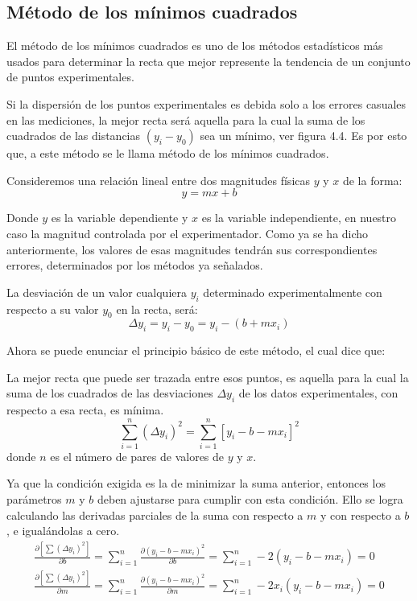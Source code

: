 \subsection{M\'etodo de los m\'inimos cuadrados}

El m\'etodo de los m\'inimos cuadrados es uno de los m\'etodos estad\'isticos m\'as usados para determinar la recta que mejor represente la tendencia de un conjunto de puntos experimentales.

Si la dispersi\'on de los puntos experimentales es debida solo a los errores casuales en las mediciones, la mejor recta ser\'a aquella para la cual la suma de los cuadrados de las distancias $\left(y_i-y_0 \right)$ sea un m\'inimo, ver figura 4.4. Es por esto que, a este m\'etodo se le llama m\'etodo de los m\'inimos cuadrados.

Consideremos una relaci\'on lineal entre dos magnitudes f\'isicas $y$ y $x$ de la forma:
$$
y=m x+b
$$

Donde $y$ es la variable dependiente y $x$ es la variable independiente, en nuestro caso la magnitud controlada por el experimentador. Como ya se ha dicho anteriormente, los valores de esas magnitudes tendr\'an sus correspondientes errores, determinados por los m\'etodos ya se\~nalados. 

La desviaci\'on de un valor cualquiera $y_i$ determinado experimentalmente con respecto a su valor $y_0$ en la recta, ser\'a:
\begin{equation}
\Delta y_i=y_i-y_0=y_i-\left(b+m x_i\right)
\label{deltay}
\end{equation}

Ahora se puede enunciar el principio b\'asico de este m\'etodo, el cual dice que:

La mejor recta que puede ser trazada entre esos puntos, es aquella para la cual la suma de los cuadrados de las desviaciones $\Delta y_i$ de los datos experimentales, con respecto a esa recta, es m\'inima.
$$
\sum_{i=1}^n\left(\Delta y_i\right)^2=\sum_{i=1}^n \left[y_i-b-m x_i \right]^2
$$
donde $n$ es el n\'umero de pares de valores de $y$ y $x$.

Ya que la condici\'on exigida es la de minimizar la suma anterior, entonces los par\'ametros $m$ y $b$ deben ajustarse para cumplir con esta condici\'on. Ello se logra calculando las derivadas parciales de la suma con respecto a $m$ y con respecto a $b$, e igual\'andolas a cero.
$$
\begin{aligned}
& \frac{\partial\left[\sum\left(\Delta y_i\right)^2\right]}{\partial b}=
\sum_{i=1}^n\frac{\partial\left(y_i-b-m x_i \right)^2}{\partial b} = 
\sum_{i=1}^n -2(y_i-b-m x_i)=0  \\
& \frac{\partial\left[\sum\left(\Delta y_i\right)^2\right]}{\partial m}=
\sum_{i=1}^n\frac{\partial\left(y_i-b-m x_i \right)^2}{\partial m} =
\sum_{i=1}^n -2x_i(y_i-b-m x_i)=0
&
\end{aligned}
$$


